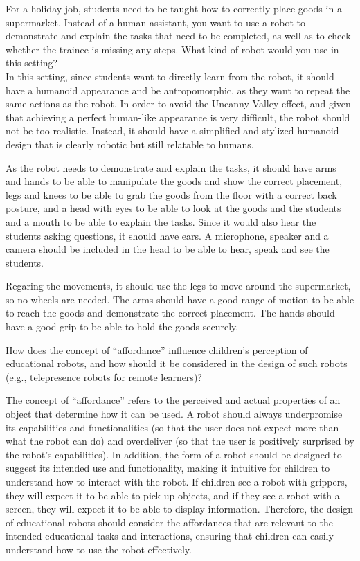 \begin{ejercicio}
    For a holiday job, students need to be taught how to correctly place goods in a supermarket. Instead of a human assistant, you want to use a robot to demonstrate and explain the tasks that need to be completed, as well as to check whether the trainee is missing any steps. What kind of robot would you use in this setting?\\

    In this setting, since students want to directly learn from the robot, it should have a humanoid appearance and be antropomorphic, as they want to repeat the same actions as the robot. In order to avoid the Uncanny Valley effect, and given that achieving a perfect human-like appearance is very difficult, the robot should not be too realistic. Instead, it should have a simplified and stylized humanoid design that is clearly robotic but still relatable to humans.

    As the robot needs to demonstrate and explain the tasks, it should have arms and hands to be able to manipulate the goods and show the correct placement, legs and knees to be able to grab the goods from the floor with a correct back posture, and a head with eyes to be able to look at the goods and the students and a mouth to be able to explain the tasks. Since it would also hear the students asking questions, it should have ears. A microphone, speaker and a camera should be included in the head to be able to hear, speak and see the students.

    Regaring the movements, it should use the legs to move around the supermarket, so no wheels are needed. The arms should have a good range of motion to be able to reach the goods and demonstrate the correct placement. The hands should have a good grip to be able to hold the goods securely.
\end{ejercicio}

\begin{ejercicio}
    How does the concept of ``affordance'' influence children's perception of educational robots, and how should it be considered in the design of such robots (e.g., telepresence robots for remote learners)?

    The concept of ``affordance'' refers to the perceived and actual properties of an object that determine how it can be used. A robot should always underpromise its capabilities and functionalities (so that the user does not expect more than what the robot can do) and overdeliver (so that the user is positively surprised by the robot's capabilities). In addition, the form of a robot should be designed to suggest its intended use and functionality, making it intuitive for children to understand how to interact with the robot. If children see a robot with grippers, they will expect it to be able to pick up objects, and if they see a robot with a screen, they will expect it to be able to display information. Therefore, the design of educational robots should consider the affordances that are relevant to the intended educational tasks and interactions, ensuring that children can easily understand how to use the robot effectively.
\end{ejercicio}


